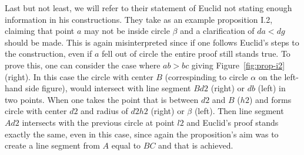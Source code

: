 \documentclass[]{interact}
\theoremstyle{plain}
\theoremstyle{definition}
\theoremstyle{remark}
\begin{document}
Last but not least, we will refer to their statement of Euclid not
stating enough information in his constructions. They take as an
example proposition I.2, claiming that point $a$ may not be inside
circle $\beta$ and a clarification of $da<dg$ should be made. This is
again misinterpreted since if one follows Euclid's steps to the
construction, even if $a$ fell out of circle the entire proof still
stands true. To prove this, one can consider the case where $ab>bc$
giving Figure~\ref{fig:prop-i2} (right). In this case the
circle with center $B$ (correspinding to circle $\alpha$ on the
left-hand side figure), would intersect with line
segment $Bd2$ (right) or $db$ (left) in two points.
When one takes the point that is between $d2$ and $B$ ($h2$) and
forms circle with center $d2$ and radius of $d2h2$ (right) or $\beta$ (left). 
Then line segment $Ad2$ intersects with the previous circle at point $l2$ and 
Euclid's proof stands exactly the same, even in this case, since again
the proposition's aim was to create a line segment from $A$ equal to
$BC$ and that is achieved.
\end{document}
